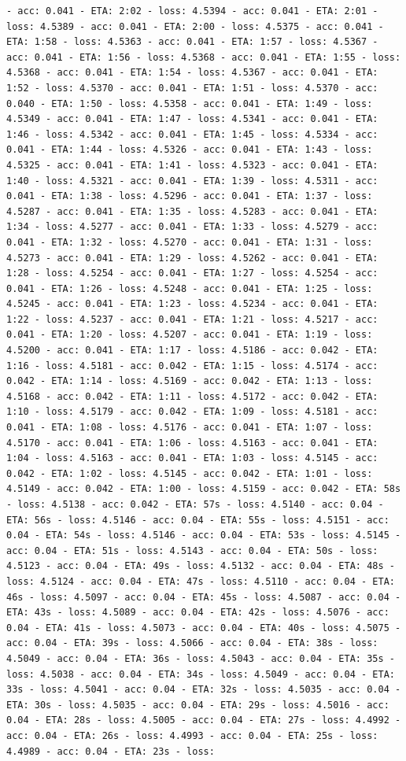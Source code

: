 \documentclass[11pt]{article}
\begin{document}
\begin{Verbatim}[commandchars=\\\{\}]
- acc: 0.041 - ETA: 2:02 - loss: 4.5394 - acc: 0.041 - ETA: 2:01 - loss: 4.5389 - acc: 0.041 - ETA: 2:00 - loss: 4.5375 - acc: 0.041 - ETA: 1:58 - loss: 4.5363 - acc: 0.041 - ETA: 1:57 - loss: 4.5367 - acc: 0.041 - ETA: 1:56 - loss: 4.5368 - acc: 0.041 - ETA: 1:55 - loss: 4.5368 - acc: 0.041 - ETA: 1:54 - loss: 4.5367 - acc: 0.041 - ETA: 1:52 - loss: 4.5370 - acc: 0.041 - ETA: 1:51 - loss: 4.5370 - acc: 0.040 - ETA: 1:50 - loss: 4.5358 - acc: 0.041 - ETA: 1:49 - loss: 4.5349 - acc: 0.041 - ETA: 1:47 - loss: 4.5341 - acc: 0.041 - ETA: 1:46 - loss: 4.5342 - acc: 0.041 - ETA: 1:45 - loss: 4.5334 - acc: 0.041 - ETA: 1:44 - loss: 4.5326 - acc: 0.041 - ETA: 1:43 - loss: 4.5325 - acc: 0.041 - ETA: 1:41 - loss: 4.5323 - acc: 0.041 - ETA: 1:40 - loss: 4.5321 - acc: 0.041 - ETA: 1:39 - loss: 4.5311 - acc: 0.041 - ETA: 1:38 - loss: 4.5296 - acc: 0.041 - ETA: 1:37 - loss: 4.5287 - acc: 0.041 - ETA: 1:35 - loss: 4.5283 - acc: 0.041 - ETA: 1:34 - loss: 4.5277 - acc: 0.041 - ETA: 1:33 - loss: 4.5279 - acc: 0.041 - ETA: 1:32 - loss: 4.5270 - acc: 0.041 - ETA: 1:31 - loss: 4.5273 - acc: 0.041 - ETA: 1:29 - loss: 4.5262 - acc: 0.041 - ETA: 1:28 - loss: 4.5254 - acc: 0.041 - ETA: 1:27 - loss: 4.5254 - acc: 0.041 - ETA: 1:26 - loss: 4.5248 - acc: 0.041 - ETA: 1:25 - loss: 4.5245 - acc: 0.041 - ETA: 1:23 - loss: 4.5234 - acc: 0.041 - ETA: 1:22 - loss: 4.5237 - acc: 0.041 - ETA: 1:21 - loss: 4.5217 - acc: 0.041 - ETA: 1:20 - loss: 4.5207 - acc: 0.041 - ETA: 1:19 - loss: 4.5200 - acc: 0.041 - ETA: 1:17 - loss: 4.5186 - acc: 0.042 - ETA: 1:16 - loss: 4.5181 - acc: 0.042 - ETA: 1:15 - loss: 4.5174 - acc: 0.042 - ETA: 1:14 - loss: 4.5169 - acc: 0.042 - ETA: 1:13 - loss: 4.5168 - acc: 0.042 - ETA: 1:11 - loss: 4.5172 - acc: 0.042 - ETA: 1:10 - loss: 4.5179 - acc: 0.042 - ETA: 1:09 - loss: 4.5181 - acc: 0.041 - ETA: 1:08 - loss: 4.5176 - acc: 0.041 - ETA: 1:07 - loss: 4.5170 - acc: 0.041 - ETA: 1:06 - loss: 4.5163 - acc: 0.041 - ETA: 1:04 - loss: 4.5163 - acc: 0.041 - ETA: 1:03 - loss: 4.5145 - acc: 0.042 - ETA: 1:02 - loss: 4.5145 - acc: 0.042 - ETA: 1:01 - loss: 4.5149 - acc: 0.042 - ETA: 1:00 - loss: 4.5159 - acc: 0.042 - ETA: 58s - loss: 4.5138 - acc: 0.042 - ETA: 57s - loss: 4.5140 - acc: 0.04 - ETA: 56s - loss: 4.5146 - acc: 0.04 - ETA: 55s - loss: 4.5151 - acc: 0.04 - ETA: 54s - loss: 4.5146 - acc: 0.04 - ETA: 53s - loss: 4.5145 - acc: 0.04 - ETA: 51s - loss: 4.5143 - acc: 0.04 - ETA: 50s - loss: 4.5123 - acc: 0.04 - ETA: 49s - loss: 4.5132 - acc: 0.04 - ETA: 48s - loss: 4.5124 - acc: 0.04 - ETA: 47s - loss: 4.5110 - acc: 0.04 - ETA: 46s - loss: 4.5097 - acc: 0.04 - ETA: 45s - loss: 4.5087 - acc: 0.04 - ETA: 43s - loss: 4.5089 - acc: 0.04 - ETA: 42s - loss: 4.5076 - acc: 0.04 - ETA: 41s - loss: 4.5073 - acc: 0.04 - ETA: 40s - loss: 4.5075 - acc: 0.04 - ETA: 39s - loss: 4.5066 - acc: 0.04 - ETA: 38s - loss: 4.5049 - acc: 0.04 - ETA: 36s - loss: 4.5043 - acc: 0.04 - ETA: 35s - loss: 4.5038 - acc: 0.04 - ETA: 34s - loss: 4.5049 - acc: 0.04 - ETA: 33s - loss: 4.5041 - acc: 0.04 - ETA: 32s - loss: 4.5035 - acc: 0.04 - ETA: 30s - loss: 4.5035 - acc: 0.04 - ETA: 29s - loss: 4.5016 - acc: 0.04 - ETA: 28s - loss: 4.5005 - acc: 0.04 - ETA: 27s - loss: 4.4992 - acc: 0.04 - ETA: 26s - loss: 4.4993 - acc: 0.04 - ETA: 25s - loss: 4.4989 - acc: 0.04 - ETA: 23s - loss: 
\end{Verbatim}
\end{document}
